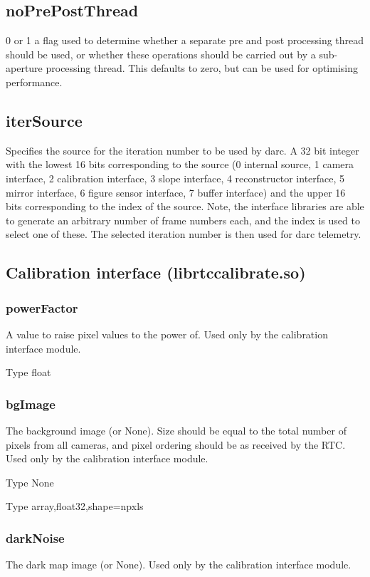 \documentclass[a4,10pt]{article}
\begin{document}
\subsection{noPrePostThread}
0 or 1 a flag used to determine whether a separate pre and post
processing thread should be used, or whether these operations should
be carried out by a sub-aperture processing thread.  This defaults to
zero, but can be used for optimising performance.

\subsection{iterSource}
Specifies the source for the iteration number to be used by darc.
A 32 bit integer with the lowest 16 bits corresponding to the source
(0 internal source, 1 camera interface, 2 calibration interface, 3
slope interface, 4 reconstructor interface, 5 mirror interface, 6
figure sensor interface, 7 buffer interface) and the upper 16 bits
corresponding to the index of the source.  Note, the interface
libraries are able to generate an arbitrary number of frame numbers
each, and the index is used to select one of these.  The selected
iteration number is then used for darc telemetry. 


\subsection{Calibration interface (librtccalibrate.so)}
\subsubsection{powerFactor}
A value to raise pixel values to the power of.  Used only by the
calibration interface module.  

Type float

\subsubsection{bgImage}
The background image (or None).  Size should be equal to the total
number of pixels from all cameras, and pixel ordering should be as
received by the RTC.  Used only by the calibration interface module.

Type None

Type array,float32,shape=npxls

\subsubsection{darkNoise}
The dark map image (or None).  Used only by the calibration interface module.
\end{document}
